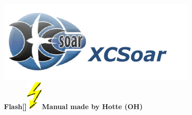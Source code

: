 \documentclass[german,a4paper,twoside]{scrreprt}
\def\bbblitz{\includegraphics[height=4.0em]{Bilder/blitz1.png}}
\begin{document}
\vspace*{5cm}
\begin{center}
\includegraphics[width=10cm]{xcsoar-title.png}\\[2em]
{\Large\textbf{\textsf{Flash\raisebox{-\baselineskip}[\ht\strutbox]{\bbblitz}Manual made by Hotte (OH)}}}\\
\end{center}

\tableofcontents
\printindex
\end{document}
